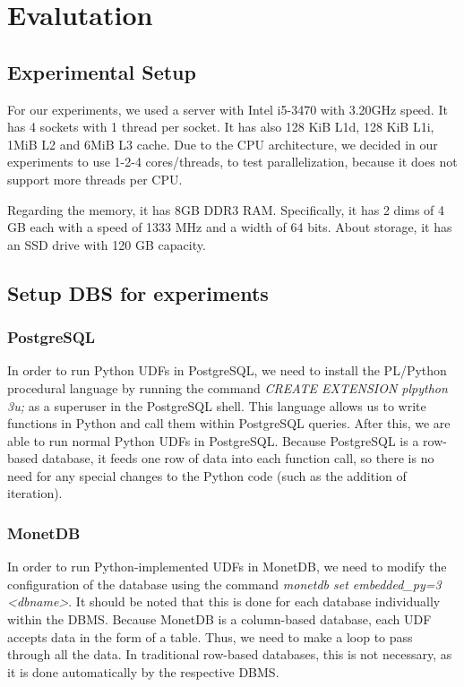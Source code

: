 \section{Evalutation}
\label{sec:experiments}

\subsection{Experimental Setup}
For our experiments, we used a server with Intel i5-3470 with 3.20GHz speed. It has 4 sockets with 1 thread per socket. 
It has also 128 KiB L1d, 128 KiB L1i, 1MiB L2 and 6MiB L3 cache. Due to the CPU architecture, we decided in our experiments to use 1-2-4 cores/threads, 
to test parallelization, because it does not support more threads per CPU.

Regarding the memory, it has 8GB DDR3 RAM. Specifically, it has 2 dims of 4 GB each with a speed of 1333 MHz and a width of 64 bits. 
About storage, it has an SSD drive with 120 GB capacity.

\subsection{Setup DBS for experiments}
\subsubsection{PostgreSQL}
In order to run Python UDFs in PostgreSQL, we need to install the PL/Python procedural language by running the command \emph{CREATE EXTENSION plpython 3u;} as a superuser in the PostgreSQL shell. 
This language allows us to write functions in Python and call them within PostgreSQL queries. After this, we are able to run normal Python UDFs in PostgreSQL. 
Because PostgreSQL is a row-based database, it feeds one row of data into each function call, so there is no need for any special changes to the Python code (such as the addition of iteration).

\subsubsection{MonetDB}
In order to run Python-implemented UDFs in MonetDB, we need to modify the configuration of the database using the command \emph{monetdb set embedded\_py=3 <dbname>}. 
It should be noted that this is done for each database individually within the DBMS. Because MonetDB is a column-based database, each UDF accepts data in the form of a table. 
Thus, we need to make a loop to pass through all the data. In traditional row-based databases, this is not necessary, as it is done automatically by the respective DBMS.


